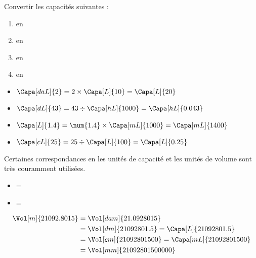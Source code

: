 \begin{methode*1}
\begin{changemargin}{0mm}{-27mm}
\begin{center}
            \vspace*{-10mm}
        \end{center}
    \end{changemargin}
    \exercice
    Convertir les capacités suivantes :
    \begin{enumerate}
        \item {} en \Capa[L]{}
        \item {} en \Capa[hL]{}
        \item {} en \Capa[mL]{}
        \item {} en \Capa[L]{}
    \end{enumerate}
    \correction
    \begin{itemize}
        \item $\Capa[daL]{2}=2\times \Capa[L]{10}=\Capa[L]{20}$
        \item $\Capa[dL]{43}=43\div \Capa[hL]{1000}=\Capa[hL]{0.043}$
        \item $\Capa[L]{1.4}=\num{1.4}\times\Capa[mL]{1000}=\Capa[mL]{1400}$
        \item $\Capa[cL]{25}=25\div\Capa[L]{100}=\Capa[L]{0.25}$
    \end{itemize}
\end{methode*1}

\begin{propriete}
    Certaines correspondances en les unités de capacité et les unités de volume sont très couramment utilisées.
    \begin{itemize}
        \item {}=
        \item {}=
    \end{itemize}
\end{propriete}

\begin{exemple*1}
    \begin{align*}
        \Vol[m]{21092.8015} &= \Vol[dam]{21.0928015} \\
        &=\Vol[dm]{21092801.5} =\Capa[L]{21092801.5} \\
        &=\Vol[cm]{21092801500} =\Capa[mL]{21092801500} \\
        &=\Vol[mm]{21092801500000}
    \end{align*}
\end{exemple*1}